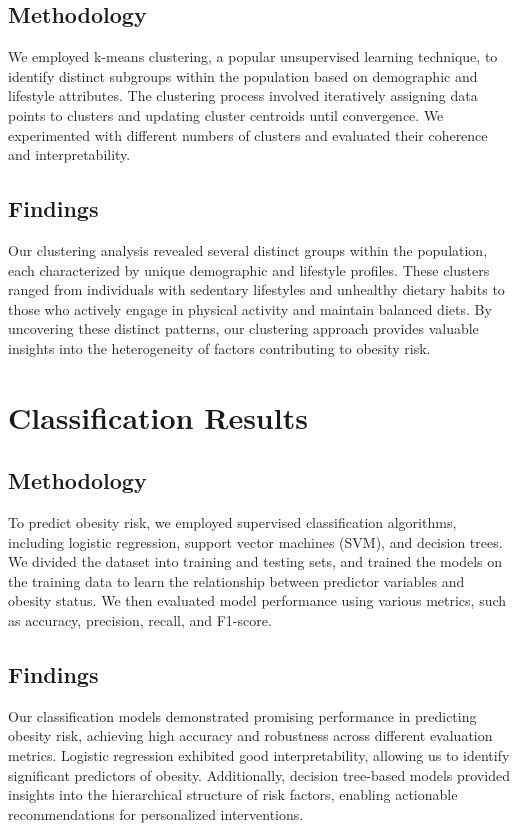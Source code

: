 \documentclass[conference]{IEEEtran}
\begin{document}
\subsection{Methodology}\label{AA}
We employed k-means clustering, a popular unsupervised learning technique, to identify distinct subgroups within the population based on demographic and lifestyle attributes. The clustering process involved iteratively assigning data points to clusters and updating cluster centroids until convergence. We experimented with different numbers of clusters and evaluated their coherence and interpretability.

\subsection{Findings}\label{AA}
Our clustering analysis revealed several distinct groups within the population, each characterized by unique demographic and lifestyle profiles. These clusters ranged from individuals with sedentary lifestyles and unhealthy dietary habits to those who actively engage in physical activity and maintain balanced diets. By uncovering these distinct patterns, our clustering approach provides valuable insights into the heterogeneity of factors contributing to obesity risk.

\section{Classification Results}

\subsection{Methodology}\label{AA}
To predict obesity risk, we employed supervised classification algorithms, including logistic regression, support vector machines (SVM), and decision trees. We divided the dataset into training and testing sets, and trained the models on the training data to learn the relationship between predictor variables and obesity status. We then evaluated model performance using various metrics, such as accuracy, precision, recall, and F1-score.

\subsection{Findings}\label{AA}
Our classification models demonstrated promising performance in predicting obesity risk, achieving high accuracy and robustness across different evaluation metrics. Logistic regression exhibited good interpretability, allowing us to identify significant predictors of obesity. Additionally, decision tree-based models provided insights into the hierarchical structure of risk factors, enabling actionable recommendations for personalized interventions.
\end{document}
